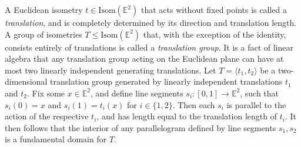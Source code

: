 \documentclass{article}
\numberwithin{equation}{section}
\newcommand{\EE}{\mathbb{E}}
\theoremstyle{definition}
\theoremstyle{remark}
\begin{document}
A Euclidean isometry $t\in \text{Isom}(\EE^2)$ that acts without fixed points is called a \textit{translation}, and is completely determined by its direction and translation length. A group of isometries $T\leq \text{Isom}(\EE^2)$ that, with the exception of the identity, consists entirely of translations is called a \textit{translation group}.
It is a fact of linear algebra that any translation group acting on the Euclidean plane can have at most two linearly independent generating translations. Let $T=\langle t_1,t_2\rangle$ be a two-dimensional translation group generated by linearly independent translations $t_1$ and $t_2$. Fix some $x\in \EE^2$, and define line segments $s_i:[0,1]\rightarrow \EE^2$, such that $s_i(0)=x$ and $s_i(1)=t_i(x)$ for $i\in\{1,2\}$. Then each $s_i$ is parallel to the action of the respective $t_i$, and has length equal to the translation length of $t_i$.
It then follows that the interior of any parallelogram defined by line segments $s_1,s_2$ is a fundamental domain for $T$.
\end{document}
